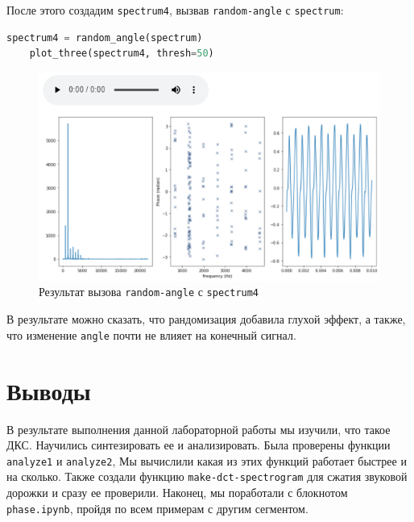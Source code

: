 \documentclass[a4paper]{article}
\begin{document}
            После этого создадим \texttt{spectrum4}, вызвав \texttt{random-angle} с \texttt{spectrum}:
            
\begin{lstlisting}[language=Python, caption= Вызов \texttt{plot-three} с \texttt{spectrum4}]
    spectrum4 = random_angle(spectrum)
    plot_three(spectrum4, thresh=50)
\end{lstlisting} 
            
            \begin{figure}[H]
                \centering
                \includegraphics[width=\textwidth]{ex_3_spectrum4.png}
                \caption{Результат вызова \texttt{random-angle} с \texttt{spectrum4}}
                \label{fig:ex_3_spectrum4}
            \end{figure}
            
            В результате можно сказать, что рандомизация добавила глухой эффект, а также, что изменение \texttt{angle} почти не влияет на конечный сигнал.
            
    \newpage
        \section{Выводы}
             В результате выполнения данной лабораторной работы мы изучили, что такое ДКС. Научились синтезировать ее и анализировать. Была проверены функции \texttt{analyze1} и \texttt{analyze2}, Мы вычислили какая из этих функций работает быстрее и на сколько. Также создали функцию \texttt{make-dct-spectrogram} для сжатия звуковой дорожки и сразу ее проверили. Наконец, мы поработали с блокнотом \texttt{phase.ipynb}, пройдя по всем примерам с другим сегментом.
            
            
            
\end{document}
